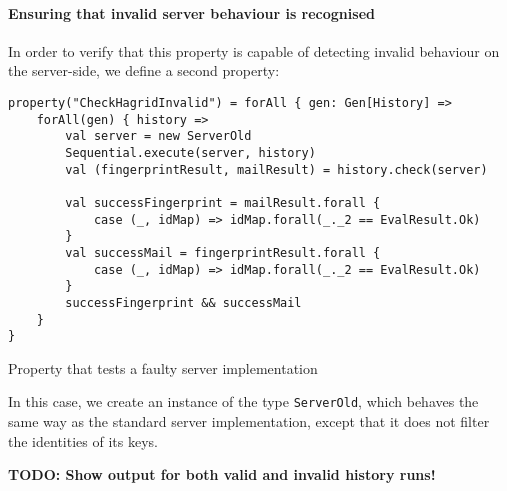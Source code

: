 \paragraph{Ensuring that invalid server behaviour is recognised}
In order to verify that this property is capable of detecting invalid behaviour on the server-side, we define a second property:
\begin{code}
    \begin{verbatim}
property("CheckHagridInvalid") = forAll { gen: Gen[History] =>
    forAll(gen) { history =>
        val server = new ServerOld
        Sequential.execute(server, history)
        val (fingerprintResult, mailResult) = history.check(server)

        val successFingerprint = mailResult.forall {
            case (_, idMap) => idMap.forall(_._2 == EvalResult.Ok)
        }
        val successMail = fingerprintResult.forall {
            case (_, idMap) => idMap.forall(_._2 == EvalResult.Ok)
        }
        successFingerprint && successMail
    }
}
    \end{verbatim}
    \caption{Property that tests a faulty server implementation}
\end{code}  

In this case, we create an instance of the type \texttt{ServerOld}, which behaves the same way as the standard server implementation, except that it does not filter the identities of its keys. 

\textbf{TODO: Show output for both valid and invalid history runs!}

